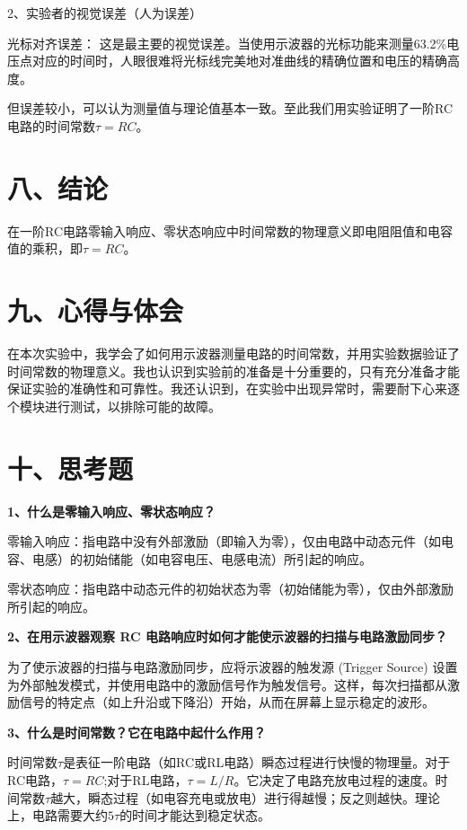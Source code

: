 \documentclass[12pt,a4paper]{article}
\begin{document}
2、实验者的视觉误差（人为误差）

光标对齐误差： 这是最主要的视觉误差。当使用示波器的光标功能来测量63.2\%电压点对应的时间时，人眼很难将光标线完美地对准曲线的精确位置和电压的精确高度。

但误差较小，可以认为测量值与理论值基本一致。至此我们用实验证明了一阶RC电路的时间常数$\tau=RC$。


\section*{八、结论}

在一阶RC电路零输入响应、零状态响应中时间常数的物理意义即电阻阻值和电容值的乘积，即$\tau=RC$。


\section*{九、心得与体会}

在本次实验中，我学会了如何用示波器测量电路的时间常数，并用实验数据验证了时间常数的物理意义。我也认识到实验前的准备是十分重要的，只有充分准备才能保证实验的准确性和可靠性。我还认识到，在实验中出现异常时，需要耐下心来逐个模块进行测试，以排除可能的故障。

\section*{十、思考题}

\textbf{1、什么是零输入响应、零状态响应？}

零输入响应：指电路中没有外部激励（即输入为零），仅由电路中动态元件（如电容、电感）的初始储能（如电容电压、电感电流）所引起的响应。

零状态响应：指电路中动态元件的初始状态为零（初始储能为零），仅由外部激励所引起的响应。

\textbf{2、在用示波器观察 RC 电路响应时如何才能使示波器的扫描与电路激励同步？}

为了使示波器的扫描与电路激励同步，应将示波器的触发源 (Trigger Source) 设置为外部触发模式，并使用电路中的激励信号作为触发信号。这样，每次扫描都从激励信号的特定点（如上升沿或下降沿）开始，从而在屏幕上显示稳定的波形。

\textbf{3、什么是时间常数？它在电路中起什么作用？}

时间常数$\tau$是表征一阶电路（如RC或RL电路）瞬态过程进行快慢的物理量。对于RC电路，$\tau=RC$;对于RL电路，$\tau=L/R$。它决定了电路充放电过程的速度。时间常数$\tau$越大，瞬态过程（如电容充电或放电）进行得越慢；反之则越快。理论上，电路需要大约$5\tau$的时间才能达到稳定状态。
\end{document}
